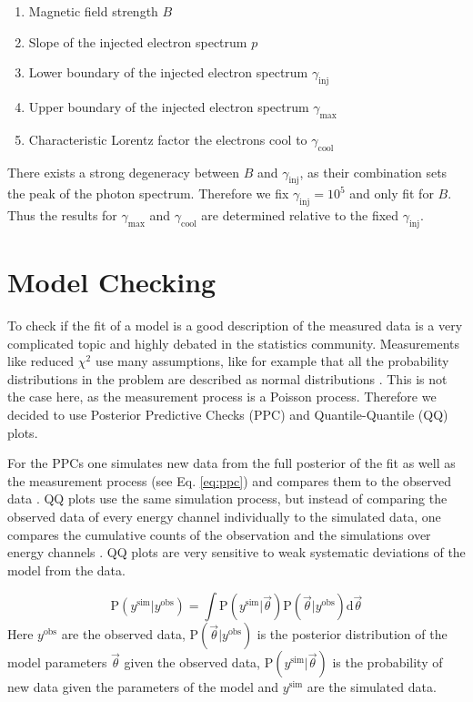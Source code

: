 \documentclass[twocolumn,traditabstract]{aa}
\begin{document}
\begin{enumerate}
	\item Magnetic field strength $B$
  \item Slope of the injected electron spectrum $p$
  \item Lower boundary of the injected electron spectrum $\gamma_{\mathrm{inj}}$
  \item Upper boundary of the injected electron spectrum $\gamma_{\mathrm{max}}$
  \item Characteristic Lorentz factor the electrons cool to $\gamma_{\mathrm{cool}}$
\end{enumerate}

There exists a strong degeneracy between $B$ and $\gamma_{\mathrm{inj}}$, as their combination sets the peak of the photon spectrum. Therefore we fix $\gamma_{\mathrm{inj}}=10^{5}$ and only fit for $B$. Thus the results for $\gamma_{\mathrm{max}}$ and $\gamma_{\mathrm{cool}}$ are determined relative to the fixed $\gamma_{\mathrm{inj}}$.

\section{Model Checking}
\label{PPC}
To check if the fit of a model is a good description of the measured data is a very complicated topic and highly debated in the statistics community. Measurements like reduced $\chi^{2}$ use many assumptions, like for example that all the probability distributions in the problem are described as normal distributions \citep{dosanddonts}. This is not the case here, as the measurement process is a Poisson process. Therefore we decided to use Posterior Predictive Checks (PPC) and Quantile-Quantile (QQ) plots.

For the PPCs one simulates new data from the full posterior of the fit as well as the measurement process (see Eq. \ref{eq:ppc}) and compares them to the observed data \citep{ppc}. QQ plots use the same simulation process, but instead of comparing the observed data of every energy channel individually to the simulated data, one compares the cumulative counts of the observation and the simulations over energy channels  \citep{QQ}. QQ plots are very sensitive to weak systematic deviations of the model from the data.

\begin{equation}
  \textrm{P}(y^{\textrm{sim}}|y^{\textrm{obs}}) = \int \textrm{P}(y^{\textrm{sim}}|\vec{\theta}) \textrm{P}(\vec{\theta}|y^{\textrm{obs}}) \mathrm{d}\vec{\theta}
  \label{eq:ppc}
\end{equation}
\noindent
Here $y^{\textrm{obs}}$ are the observed data, $\textrm{P}(\vec{\theta}|y^{\textrm{obs}})$ is the posterior distribution of the model parameters $\vec{\theta}$ given the observed data, $\textrm{P}(y^{\textrm{sim}}|\vec{\theta})$ is the probability of new data given the parameters of the model and $y^{\textrm{sim}}$ are the simulated data.
\end{document}

